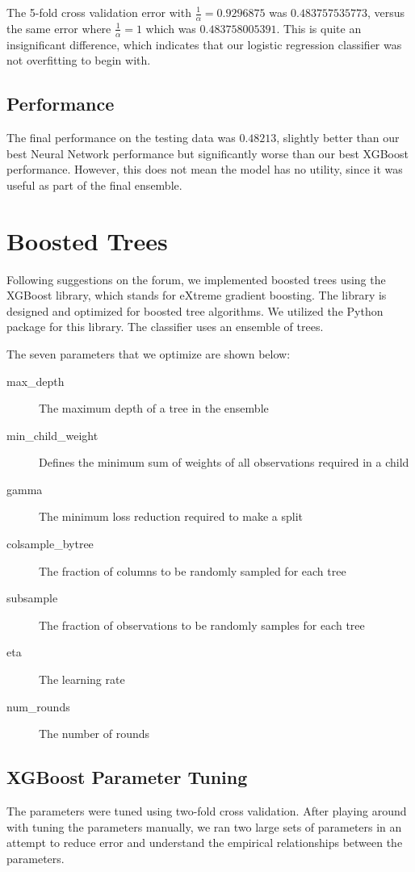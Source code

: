 \documentclass[twoside,11pt]{article}
\theoremstyle{definition}
\begin{document}
  The 5-fold cross validation error with $\frac{1}{\alpha} = 0.9296875$ was $0.483757535773$, versus the same error where $\frac{1}{\alpha} = 1$ which was $0.483758005391$. This is quite an insignificant difference, which indicates that our logistic regression classifier was not overfitting to begin with.

  \subsection{Performance}
  The final performance on the testing data was $0.48213$, slightly better than our best Neural Network performance but significantly worse than our best XGBoost performance. However, this does not mean the model has no utility, since it was useful as part of the final ensemble.

\section{Boosted Trees}

  Following suggestions on the forum, we implemented boosted trees using the XGBoost library, which stands for eXtreme gradient boosting. The library is designed and optimized for boosted tree algorithms. We utilized the Python package for this library. The classifier uses an ensemble of trees.

  The seven parameters that we optimize are shown below:

  \begin{description}
    \item[max\_depth] The maximum depth of a tree in the ensemble
    \item[min\_child\_weight] Defines the minimum sum of weights of all observations required in a child
    \item[gamma] The minimum loss reduction required to make a split
    \item[colsample\_bytree] The fraction of columns to be randomly sampled for each tree
    \item[subsample] The fraction of observations to be randomly samples for each tree
    \item[eta] The learning rate
    \item[num\_rounds] The number of rounds
  \end{description}

  \subsection{XGBoost Parameter Tuning}
    The parameters were tuned using two-fold cross validation. After playing around with tuning the parameters manually, we ran two large sets of parameters in an attempt to reduce error and understand the empirical relationships between the parameters.
\end{document}
